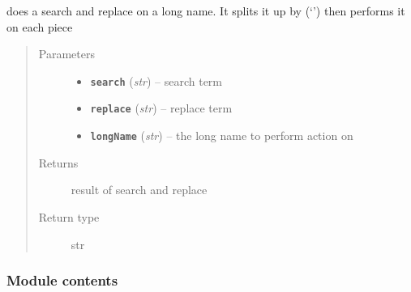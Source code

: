 \documentclass[letterpaper,10pt,english]{sphinxmanual}
\begin{document}
\begin{fulllineitems}
\label{zBuilder.data:zBuilder.data.mesh.get_mesh_connectivity}
\end{fulllineitems}


\begin{fulllineitems}
\label{zBuilder.data:zBuilder.data.mesh.get_mesh_data}
\end{fulllineitems}


\begin{fulllineitems}
\label{zBuilder.data:zBuilder.data.mesh.replace_longname}
does a search and replace on a long name.  It splits it up by (`\textbar{}') then
performs it on each piece
\begin{quote}\begin{description}
\item[{Parameters}] \leavevmode\begin{itemize}
\item {} 
\textbf{\texttt{search}} (\emph{str}) -- search term

\item {} 
\textbf{\texttt{replace}} (\emph{str}) -- replace term

\item {} 
\textbf{\texttt{longName}} (\emph{str}) -- the long name to perform action on

\end{itemize}

\item[{Returns}] \leavevmode
result of search and replace

\item[{Return type}] \leavevmode
str

\end{description}\end{quote}

\end{fulllineitems}



\subsubsection{Module contents}
\label{zBuilder.data:module-contents}\label{zBuilder.data:module-zBuilder.data}
\end{document}

